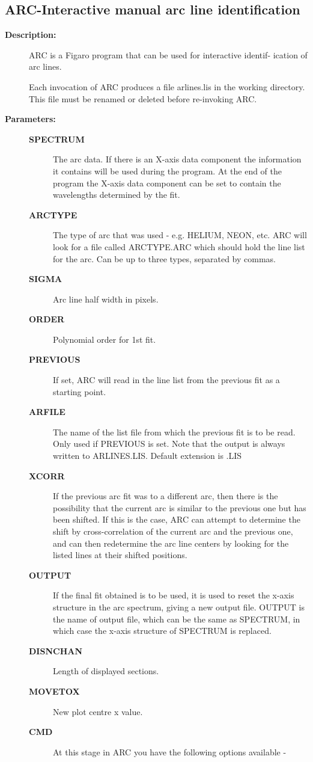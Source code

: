 \subsection{ARC-\label{ARC}Interactive manual arc line identification}
\begin{description}

\item [{\bf Description:}]
 ARC is a Figaro program that can be used for interactive identif-
 ication of arc lines.

 Each invocation of ARC produces a file arlines.lis in the working
 directory.  This file must be renamed or deleted before re-invoking
 ARC.

\item [{\bf Parameters:}]
\begin{description}
\item [{\bf SPECTRUM}]
 The arc data. If there is an X-axis data component the information it
 contains will be used during the program.  At the end of the program
 the X-axis data component can be set to contain the wavelengths
 determined by the fit.
\item [{\bf ARCTYPE}]
 The type of arc that was used - e.g. HELIUM, NEON, etc.  ARC will look
 for a file called ARCTYPE.ARC which should hold the line list for the
 arc.  Can be up to three types, separated by commas.
\item [{\bf SIGMA}]
 Arc line half width in pixels.
\item [{\bf ORDER}]
 Polynomial order for 1st fit.
\item [{\bf PREVIOUS}]
 If set, ARC will read in the line list from the previous fit as
 a starting point.
\item [{\bf ARFILE}]
 The name of the list file from which the previous fit is to be read.
 Only used if PREVIOUS is set.  Note that the output is always
 written to ARLINES.LIS.  Default extension is .LIS
\item [{\bf XCORR}]
 If the previous arc fit was to a different arc, then there is the
 possibility that the current arc is similar to the previous one but
 has been shifted. If this is the case, ARC can attempt to determine
 the shift by cross-correlation of the current arc and the previous
 one, and can then redetermine the arc line centers by looking for the
 listed lines at their shifted positions.
\item [{\bf OUTPUT}]
 If the final fit obtained is to be used, it is used to reset the
 x-axis structure in the arc spectrum, giving a new output file.
 OUTPUT is the name of output file, which can be the same as SPECTRUM,
 in which case the x-axis structure of SPECTRUM is replaced.
\item [{\bf DISNCHAN}]
 Length of displayed sections.
\item [{\bf MOVETOX}]
 New plot centre x value.
\item [{\bf CMD}]
 At this stage in ARC you have the following options available -


\end{description}
\end{description}
